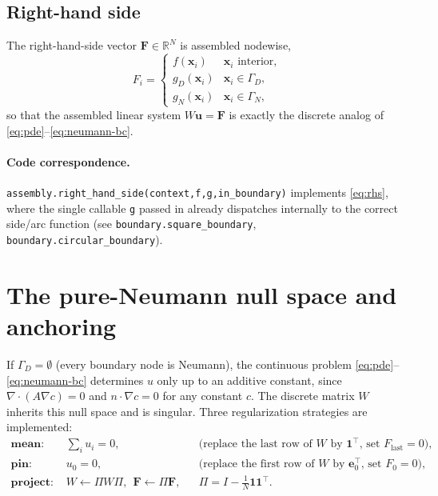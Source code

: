\documentclass[11pt]{article}
\newcommand{\bx}{\mathbf{x}}
\newcommand{\R}{\mathbb{R}}
\newcommand{\diver}{\nabla\!\cdot}
\newcommand{\grad}{\nabla}
\begin{document}
\subsection{Right-hand side}
\label{sec:rhs}

The right-hand-side vector $\mathbf{F} \in \R^N$ is assembled
nodewise,
\begin{equation}
  F_i =
  \begin{cases}
    f(\bx_i) & \bx_i \text{ interior}, \\
    g_D(\bx_i) & \bx_i \in \Gamma_D, \\
    g_N(\bx_i) & \bx_i \in \Gamma_N,
  \end{cases}
  \label{eq:rhs}
\end{equation}
so that the assembled linear system $W\mathbf{u} = \mathbf{F}$ is
exactly the discrete analog of \eqref{eq:pde}--\eqref{eq:neumann-bc}.

\paragraph{Code correspondence.}
\texttt{assembly.right\_hand\_side(context,f,g,in\_boundary)}
implements \eqref{eq:rhs}, where the single callable \texttt{g} passed
in already dispatches internally to the correct side/arc function
(see \texttt{boundary.square\_boundary}, \texttt{boundary.circular\_boundary}).

\section{The pure-Neumann null space and anchoring}

If $\Gamma_D = \emptyset$ (every boundary node is Neumann), the
continuous problem \eqref{eq:pde}--\eqref{eq:neumann-bc} determines $u$
only up to an additive constant, since $\diver(A\grad c) = 0$ and
$n\cdot\grad c = 0$ for any constant $c$. The discrete matrix $W$
inherits this null space and is singular. Three regularization
strategies are implemented:
\begin{align}
  \textbf{mean: } &\textstyle\sum_i u_i = 0,
  &&\text{(replace the last row of $W$ by $\mathbf{1}^\top$, set
  $F_{\text{last}}=0$),} \\
  \textbf{pin: } &u_0 = 0,
  &&\text{(replace the first row of $W$ by $\mathbf{e}_0^\top$, set
  $F_0 = 0$),} \\
  \textbf{project: } &W \leftarrow \Pi W \Pi,\ \ \mathbf{F} \leftarrow
  \Pi \mathbf{F},
  &&\Pi = I - \tfrac1N \mathbf{1}\mathbf{1}^\top.
  \label{eq:anchor}
\end{align}
\end{document}
